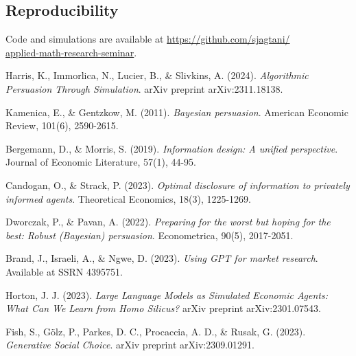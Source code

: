 \documentclass[12pt]{article}
\begin{document}
\subsection{Reproducibility}

Code and simulations are available at \url{https://github.com/sjagtani/}\\ 
\url{applied-math-research-seminar}.


\begin{thebibliography}{8}

Harris, K., Immorlica, N., Lucier, B., \& Slivkins, A. (2024).
\textit{Algorithmic Persuasion Through Simulation}.
arXiv preprint arXiv:2311.18138.

Kamenica, E., \& Gentzkow, M. (2011).
\textit{Bayesian persuasion}.
American Economic Review, 101(6), 2590-2615.

Bergemann, D., \& Morris, S. (2019).
\textit{Information design: A unified perspective}.
Journal of Economic Literature, 57(1), 44-95.

Candogan, O., \& Strack, P. (2023).
\textit{Optimal disclosure of information to privately informed agents}.
Theoretical Economics, 18(3), 1225-1269.

Dworczak, P., \& Pavan, A. (2022).
\textit{Preparing for the worst but hoping for the best: Robust (Bayesian) persuasion}.
Econometrica, 90(5), 2017-2051.

Brand, J., Israeli, A., \& Ngwe, D. (2023).
\textit{Using GPT for market research}.
Available at SSRN 4395751.

Horton, J. J. (2023).
\textit{Large Language Models as Simulated Economic Agents: What Can We Learn from Homo Silicus?}
arXiv preprint arXiv:2301.07543.

Fish, S., G\"{o}lz, P., Parkes, D. C., Procaccia, A. D., \& Rusak, G. (2023).
\textit{Generative Social Choice}.
arXiv preprint arXiv:2309.01291.

\end{thebibliography}
\end{document}
